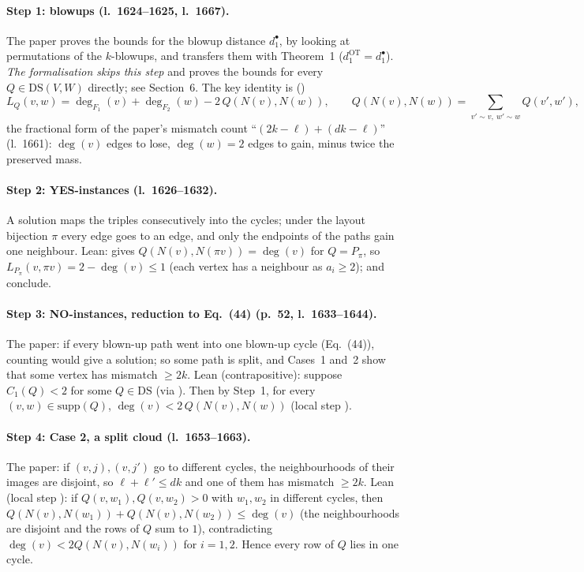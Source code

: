 \paragraph{Step 1: blowups (l.~1624--1625, l.~1667).} The paper proves the bounds for the blowup distance
$d^{\bullet}_1$, by looking at permutations of the $k$-blowups, and transfers them with Theorem~1
($d^{\mathrm{OT}}_1=d^{\bullet}_1$). \emph{The formalisation skips this step} and proves the bounds for every
$Q\in\mathrm{DS}(V,W)$ directly; see Section~6. The key identity is ()
\[ L_Q(v,w)=\deg_{F_1}(v)+\deg_{F_2}(w)-2\,Q(N(v),N(w)),\qquad
   Q(N(v),N(w))=\sum_{v'\sim v,\ w'\sim w}Q(v',w'), \]
the fractional form of the paper's mismatch count ``$(2k-\ell)+(dk-\ell)$'' (l.~1661): $\deg(v)$ edges to
lose, $\deg(w)=2$ edges to gain, minus twice the preserved mass.

\paragraph{Step 2: YES-instances (l.~1626--1632).} A solution maps the triples consecutively into the cycles;
under the layout bijection $\pi$ every edge goes to an edge, and only the endpoints of the paths gain one
neighbour. Lean:  gives $Q(N(v),N(\pi v))=\deg(v)$ for $Q=P_\pi$, so
$L_{P_\pi}(v,\pi v)=2-\deg(v)\le1$ (each vertex has a neighbour as $a_i\ge2$);  and
 conclude.

\paragraph{Step 3: NO-instances, reduction to Eq.~(44) (p.~52, l.~1633--1644).} The paper: if every blown-up path
went into one blown-up cycle (Eq.~(44)), counting would give a solution; so some path is split, and Cases~1
and~2 show that some vertex has mismatch $\ge2k$. Lean (contrapositive): suppose $C_1(Q)<2$ for some
$Q\in\mathrm{DS}$ (via ). Then by Step~1, for every $(v,w)\in\mathrm{supp}(Q)$,
$\deg(v)<2\,Q(N(v),N(w))$ (local step ).

\paragraph{Step 4: Case 2, a split cloud (l.~1653--1663).} The paper: if $(v,j),(v,j')$ go to different
cycles, the neighbourhoods of their images are disjoint, so $\ell+\ell'\le dk$ and one of them has mismatch
$\ge2k$. Lean (local step ): if $Q(v,w_1),Q(v,w_2)>0$ with $w_1,w_2$ in different cycles, then
$Q(N(v),N(w_1))+Q(N(v),N(w_2))\le\deg(v)$ (the neighbourhoods are disjoint and the rows of $Q$ sum to $1$),
contradicting $\deg(v)<2Q(N(v),N(w_i))$ for $i=1,2$. Hence every row of $Q$ lies in one cycle.

